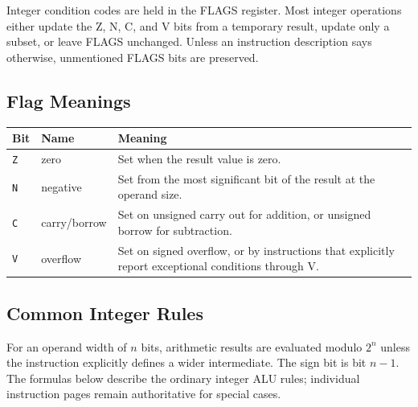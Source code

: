 Integer condition codes are held in the FLAGS register. Most integer operations either update
the Z, N, C, and V bits from a temporary result, update only a subset, or leave FLAGS unchanged.
Unless an instruction description says otherwise, unmentioned FLAGS bits are preserved.

\subsection{Flag Meanings}
\begingroup\footnotesize
\begin{longtable}{@{}p{0.55in}p{1.15in}p{3.75in}@{}}
\toprule
\textbf{Bit} & \textbf{Name} & \textbf{Meaning}\\
\midrule
\endhead
\texttt{Z} & zero & Set when the result value is zero.\\
\texttt{N} & negative & Set from the most significant bit of the result at the operand size.\\
\texttt{C} & carry/borrow & Set on unsigned carry out for addition, or unsigned borrow for subtraction.\\
\texttt{V} & overflow & Set on signed overflow, or by instructions that explicitly report exceptional conditions through V.\\
\bottomrule
\end{longtable}
\endgroup

\subsection{Common Integer Rules}
For an operand width of \(n\) bits, arithmetic results are evaluated modulo \(2^n\) unless the
instruction explicitly defines a wider intermediate. The sign bit is bit \(n-1\). The formulas
below describe the ordinary integer ALU rules; individual instruction pages remain authoritative
for special cases.

